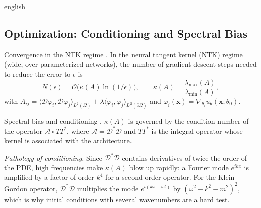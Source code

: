 \documentclass[0000.tex]{subfiles}
\begin{document}
\begin{hyphenrules}{english}
\subsection{Optimization: Conditioning and Spectral Bias}

\begin{teorema}{Convergence in the NTK regime \cite[Theorem~7.9]{deryck2024operator}.}\label{thm:ntk-conv}
In the neural tangent kernel (NTK) regime (wide, over-parameterized networks), the number of gradient
descent steps needed to reduce the error to $\epsilon$ is
\[
  N(\epsilon)=\mathcal{O}\big(\kappa(A)\ln(1/\epsilon)\big),\qquad\kappa(A)=\frac{\lambda_{\max}(A)}{\lambda_{\min}(A)},
\]
with
$A_{ij}=\langle\mathcal{D}\varphi_i,\mathcal{D}\varphi_j\rangle_{L^2(\Omega)}+\lambda\langle\varphi_i,\varphi_j\rangle_{L^2(\partial\Omega)}$
and $\varphi_i(\mathbf{x})=\nabla_{\theta_i}u_\theta(\mathbf{x};\theta_0)$.
\end{teorema}

\begin{teorema}{Spectral bias and conditioning \cite[Theorem~7.10]{deryck2024operator}.}\label{thm:spectral-bias}
$\kappa(A)$ is governed by the condition number of the operator $\mathcal{A}\circ TT^{*}$, where
$\mathcal{A}=\mathcal{D}^{*}\mathcal{D}$ and $TT^{*}$ is the integral operator whose kernel is associated
with the architecture.
\end{teorema}

\emph{Pathology of conditioning.} Since $\mathcal{D}^{*}\mathcal{D}$ contains derivatives of twice the
order of the PDE, high frequencies make $\kappa(A)$ blow up rapidly: a Fourier mode $e^{ikx}$ is
amplified by a factor of order $k^{4}$ for a second-order operator. For the Klein--Gordon operator,
$\mathcal{D}^{*}\mathcal{D}$ multiplies the mode $e^{i(kx-\omega t)}$ by $(\omega^2-k^2-m^2)^2$, which
is why initial conditions with several wavenumbers are a hard test.


\end{hyphenrules}
\end{document}
